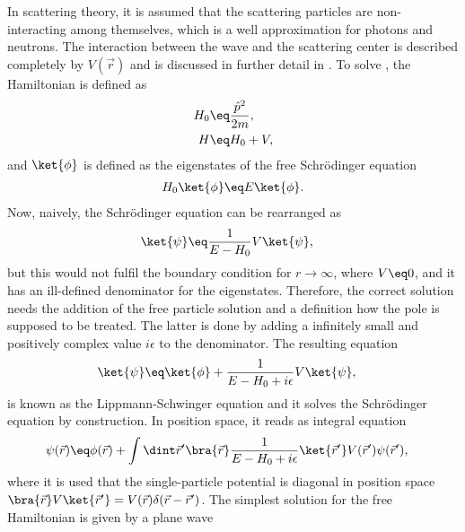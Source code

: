 \documentclass[\main/dresen_thesis.tex]{subfiles}
\begin{document}
    In scattering theory, it is assumed that the scattering particles are non-interacting among themselves, which is a well approximation for photons and neutrons.
    The interaction between the wave and the scattering center is described completely by $V(\vec{r})$ and is discussed in further detail in .
    To solve , the Hamiltonian is defined as
    \begin{align}
      H_0 &\eq \frac{\hat{p}^2}{2m},\\
      H &\eq H_0 + V,
    \end{align}
    and $\ket{\phi}$ is defined as the eigenstates of the free Schr\"odinger equation
    \begin{align}
      H_0 \ket{\phi} &\eq E \ket{\phi}.\\
    \end{align}
    Now, naively, the Schr\"odinger equation can be rearranged as
    \begin{align}
      \ket{\psi} &\eq \frac{1}{E - H_0} V \ket{\psi},
    \end{align}
    but this would not fulfil the boundary condition for $r \rightarrow \infty$, where $V\eq0$, and it has an ill-defined denominator for the eigenstates.
    Therefore, the correct solution needs the addition of the free particle solution and a definition how the pole is supposed to be treated.
    The latter is done by adding a infinitely small and positively complex value $i\epsilon$ to the denominator. The resulting equation
    \begin{align}
      \ket{\psi} &\eq \ket{\phi} +  \frac{1}{E - H_0 + i \epsilon} V \ket{\psi},
    \end{align}
    is known as the Lippmann-Schwinger equation and  it solves the Schr\"odinger equation by construction.
    In position space, it reads as integral equation
    \begin{align}
      \psi (\vec{r}) &\eq \phi(\vec{r}) + \int \dint \vec{r}^\prime \bra{\vec{r}}\frac{1}{E - H_0 + i \epsilon} \ket{\vec{r}^\prime} V (\vec{r}^\prime)\psi (\vec{r}^\prime),
      \label{eq:theoreticalBackground:scattering:scatteringTheory:LippmanSchwingerIntegralEquation}
    \end{align}
    where it is used that the single-particle potential is diagonal in position space $\bra{\vec{r}} V \ket{\vec{r}^\prime} = V(\vec{r}) \delta(\vec{r} - \vec{r}^\prime)$.
    The simplest solution for the free Hamiltonian is given by a plane wave
\end{document}
